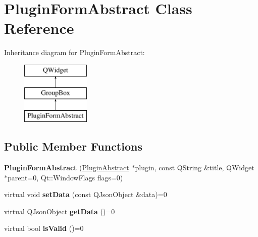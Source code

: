 \hypertarget{class_plugin_form_abstract}{\section{Plugin\-Form\-Abstract Class Reference}
\label{class_plugin_form_abstract}
}
Inheritance diagram for Plugin\-Form\-Abstract\-:\begin{figure}[H]
\begin{center}
\leavevmode
\includegraphics[height=3.000000cm]{class_plugin_form_abstract}
\end{center}
\end{figure}
\subsection*{Public Member Functions}
\begin{DoxyCompactItemize}
\item 
\hypertarget{class_plugin_form_abstract_a95dc9739fc3a38fce4893385043b3015}{{\bfseries Plugin\-Form\-Abstract} (\hyperlink{class_plugin_abstract}{Plugin\-Abstract} $\ast$plugin, const Q\-String \&title, Q\-Widget $\ast$parent=0, Qt\-::\-Window\-Flags flags=0)}\label{class_plugin_form_abstract_a95dc9739fc3a38fce4893385043b3015}

\item 
\hypertarget{class_plugin_form_abstract_aa85c8367bb1874851f42de007723c4b8}{virtual void {\bfseries set\-Data} (const Q\-Json\-Object \&data)=0}\label{class_plugin_form_abstract_aa85c8367bb1874851f42de007723c4b8}

\item 
\hypertarget{class_plugin_form_abstract_a00042d35ccf61e83cf7da2d461e8b0d3}{virtual Q\-Json\-Object {\bfseries get\-Data} ()=0}\label{class_plugin_form_abstract_a00042d35ccf61e83cf7da2d461e8b0d3}

\item 
\hypertarget{class_plugin_form_abstract_a422b95e688821566b3d614fdb97e0828}{virtual bool {\bfseries is\-Valid} ()=0}\label{class_plugin_form_abstract_a422b95e688821566b3d614fdb97e0828}

\end{DoxyCompactItemize}

